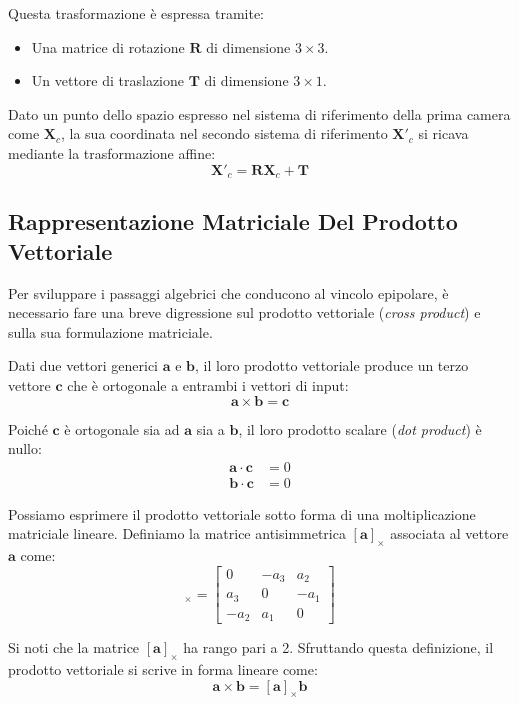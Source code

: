 ﻿\documentclass[11pt, a4paper]{article}
\begin{document}
Questa trasformazione è espressa tramite:
\begin{itemize}[noitemsep]
    \item Una matrice di rotazione $\bm{R}$ di dimensione $3 \times 3$.
    \item Un vettore di traslazione $\bm{T}$ di dimensione $3 \times 1$.
\end{itemize}

Dato un punto dello spazio espresso nel sistema di riferimento della prima camera come $\bm{X}_c$, la sua coordinata nel secondo sistema di riferimento $\bm{X}'_c$ si ricava mediante la trasformazione affine:
\begin{equation}
\bm{X}'_c = \bm{R} \bm{X}_c + \bm{T}
\end{equation}



\subsection{Rappresentazione Matriciale Del Prodotto Vettoriale}

Per sviluppare i passaggi algebrici che conducono al vincolo epipolare, è necessario fare una breve digressione sul prodotto vettoriale (\emph{cross product}) e sulla sua formulazione matriciale.

Dati due vettori generici $\bm{a}$ e $\bm{b}$, il loro prodotto vettoriale produce un terzo vettore $\bm{c}$ che è ortogonale a entrambi i vettori di input:
\[
\bm{a} \times \bm{b} = \bm{c}
\]

Poiché $\bm{c}$ è ortogonale sia ad $\bm{a}$ sia a $\bm{b}$, il loro prodotto scalare (\emph{dot product}) è nullo:
\begin{align*}
\bm{a} \cdot \bm{c} &= 0 \\
\bm{b} \cdot \bm{c} &= 0
\end{align*}

Possiamo esprimere il prodotto vettoriale sotto forma di una moltiplicazione matriciale lineare. Definiamo la matrice antisimmetrica $[\bm{a}]_{\times}$ associata al vettore $\bm{a}$ come:
\begin{equation}
[\bm{a}]_{\times} = \begin{bmatrix} 0 & -a_3 & a_2 \\ a_3 & 0 & -a_1 \\ -a_2 & a_1 & 0 \end{bmatrix}
\end{equation}

Si noti che la matrice $[\bm{a}]_{\times}$ ha rango pari a 2. Sfruttando questa definizione, il prodotto vettoriale si scrive in forma lineare come:
\begin{equation}
\bm{a} \times \bm{b} = [\bm{a}]_{\times} \bm{b}
\end{equation}
\end{document}
